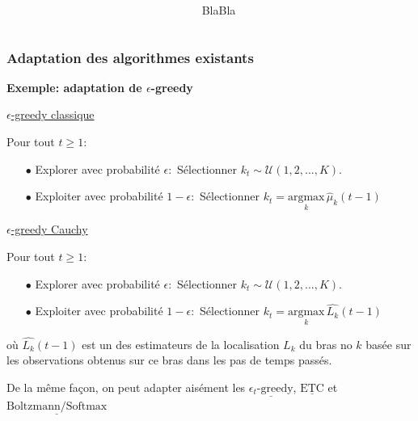 \documentclass[8pt, sans]{beamer}
\begin{document}
\begin{frame}
\begin{columns}[T]
\begin{column}{0.5\linewidth}
\end{column}

\pause

\begin{column}{0.5\linewidth}

BlaBla
\end{column}

\end{columns}


\end{frame}


\begin{frame}
\frametitle{Adaptation des algorithmes existants}
\pause

\textbf{Exemple: adaptation de $\epsilon$-greedy}

\vfill
\pause

\underline{$\epsilon$-greedy classique}\\

\vfill
\pause

Pour tout $t\geq 1:$

\begin{itemize}
\item[$\bullet$] Explorer avec probabilité $\epsilon:$ Sélectionner $k_t\sim\mathcal{U}({1,2,...,K}).$
\item[$\bullet$] Exploiter avec probabilité $1-\epsilon:$ Sélectionner $k_t=\underset{k}{\mathrm{argmax}}\, \hat{\mu}_k(t-1)$
\end{itemize}

\pause
\vfill

\underline{$\epsilon$-greedy Cauchy}

\pause
\vfill
Pour tout $t\geq 1:$

\begin{itemize}
\item[$\bullet$] Explorer avec probabilité $\epsilon:$ Sélectionner $k_t\sim\mathcal{U}({1,2,...,K}).$
\item[$\bullet$] Exploiter avec probabilité $1-\epsilon:$ Sélectionner $k_t=\underset{k}{\mathrm{argmax}}\, \widehat{L_k}(t-1)$
\end{itemize}

\vfill

où $\widehat{L_k}(t-1)$ est un des estimateurs de la localisation $L_k$ du bras no $k$ basée sur les observations obtenus sur ce bras dans les pas de temps passés.

\pause
\vfill

De la même façon, on peut adapter aisément les $\underline{\epsilon_t\text{-greedy}}$,
$\underline{\text{ETC}}$ et $\underline{\text{Boltzmann/Softmax}}$ 

\end{frame}
\end{document}
